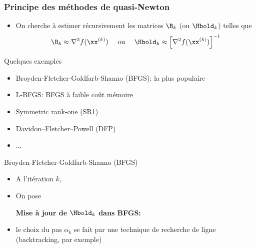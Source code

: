 \documentclass[9pt,table]{beamer} %
\begin{document}
\begin{frame}
\frametitle{Principe des méthodes de quasi-Newton}


\begin{itemize}[label=\tiny$\blacksquare$]
	\item On cherche à estimer récursivement les matrices $\B_k$ (ou $\Hbold_k$) telles que 
  \[
    \B_k \approx \nabla^2 f(\xx^{(k)}) \quad \text{ ou } \quad \Hbold_k \approx \left[\nabla^2 f(\xx^{(k)})\right]^{-1}
    \]

\end{itemize}

\alert{Quelques exemples}
\begin{itemize}[label=\alert{-}]
  \item Broyden-Fletcher-Goldfarb-Shanno (BFGS): la plus populaire
  \item L-BFGS: BFGS à faible coût mémoire
  \item Symmetric rank-one (SR1)
  \item Davidon–Fletcher–Powell (DFP)
  \item[] ...
\end{itemize}
\end{frame}


\begin{frame}{Broyden-Fletcher-Goldfarb-Shanno (BFGS)}

\begin{itemize}[label=\tiny$\blacksquare$]
\item A l'itération $k$, 

\item On pose

\textbf{\alert{Mise à jour de $\Hbold_k$ dans BFGS:}}

\item le choix du pas $\alpha_k$ se fait par une technique de recherche de ligne (backtracking, par exemple)
\end{itemize}
\end{frame}
\end{document}
